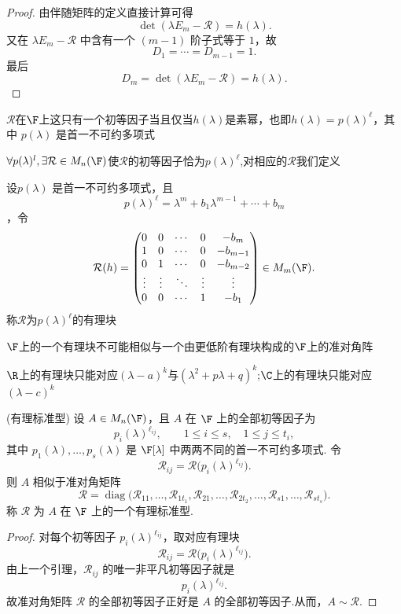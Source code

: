 \begin{proof}
	由伴随矩阵的定义直接计算可得
	\[
	\det(\lambda E_m-\mathcal{R})=h(\lambda).
	\]
	又在 $\lambda E_m-\mathcal{R}$ 中含有一个 $(m-1)$ 阶子式等于 $1$，故
	\[
	D_1=\cdots=D_{m-1}=1.
	\]
	最后
	\[
	D_m=\det(\lambda E_m-\mathcal{R})=h(\lambda).
	\]
\end{proof}

$\mathcal{R}$在$\F$上这只有一个初等因子当且仅当$h(\lambda)$是素幂，也即$h(\lambda)=p(\lambda)^\ell$，其中 $p(\lambda)$ 是首一不可约多项式

$\forall p(\lambda)^l,\exists \mathcal{R}\in M_{n}(\F)$使$\mathcal{R}$的初等因子恰为$p(\lambda)^\ell$,对相应的$\mathcal{R}$我们定义
\begin{definition}\label{p1:concept:c5-l2759}
	 设$p(\lambda)$ 是首一不可约多项式，且\[p(\lambda)^\ell = \lambda^m + b_1 \lambda^{m-1} + \cdots + b_m\]
	 ，令\[
	 \mathcal{R}(h)=
	 \begin{pmatrix}
	 	0&0&\cdots&0&-b_m\\
	 	1&0&\cdots&0&-b_{m-1}\\
	 	0&1&\cdots&0&-b_{m-2}\\
	 	\vdots&\vdots&\ddots&\vdots&\vdots\\
	 	0&0&\cdots&1&-b_1
	 \end{pmatrix}\in M_m(\F).
	 \]
	 称$\mathcal{R}$为$p(\lambda)^\ell$的有理块
\end{definition}
$\F$上的一个有理块不可能相似与一个由更低阶有理块构成的$\F$上的准对角阵

$\R$上的有理块只能对应$(\lambda -a)^k$与$(\lambda^2 + p\lambda +q)^k$;$\C$上的有理块只能对应$(\lambda -c)^k$
\begin{theorem}(有理标准型)
	设 $A\in M_n(\F)$，且 $A$ 在 $\F$ 上的全部初等因子为
	\[
	p_i(\lambda)^{\ell_{ij}},
	\qquad
	1\leq i\leq s,\quad 1\leq j\leq t_i,
	\]
	其中 $p_1(\lambda),\ldots,p_s(\lambda)$ 是 $\F[\lambda]$ 中两两不同的首一不可约多项式.
	令
	\[
	\mathcal{R}_{ij}=\mathcal{R}\bigl(p_i(\lambda)^{\ell_{ij}}\bigr).
	\]
	则 $A$ 相似于准对角矩阵
	\[
	\mathcal{R}=
	\operatorname{diag}
	\bigl(
	\mathcal{R}_{11},\ldots,\mathcal{R}_{1t_1},
	\mathcal{R}_{21},\ldots,\mathcal{R}_{2t_2},
	\ldots,
	\mathcal{R}_{s1},\ldots,\mathcal{R}_{st_s}
	\bigr).
	\]
	\label{p1:concept:c5-l2799}称 $\mathcal{R}$ 为 $A$ 在 $\F$ 上的一个有理标准型.
\end{theorem}

\begin{proof}
	对每个初等因子 $p_i(\lambda)^{\ell_{ij}}$，取对应有理块
	\[
	\mathcal{R}_{ij}=\mathcal{R}\bigl(p_i(\lambda)^{\ell_{ij}}\bigr).
	\]
	由上一个引理，$\mathcal{R}_{ij}$ 的唯一非平凡初等因子就是
	\[
	p_i(\lambda)^{\ell_{ij}}.
	\]
	故准对角矩阵 $\mathcal{R}$ 的全部初等因子正好是 $A$ 的全部初等因子.从而，$A\sim \mathcal{R}$.
\end{proof}

